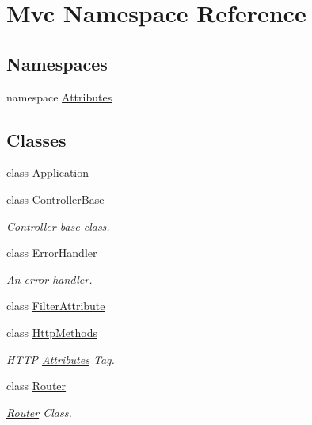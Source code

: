 \hypertarget{namespace_mvc}{}\section{Mvc Namespace Reference}
\label{namespace_mvc}
\subsection*{Namespaces}
\begin{DoxyCompactItemize}
\item 
namespace \hyperlink{namespace_mvc_1_1_attributes}{Attributes}
\end{DoxyCompactItemize}
\subsection*{Classes}
\begin{DoxyCompactItemize}
\item 
class \hyperlink{class_mvc_1_1_application}{Application}
\item 
class \hyperlink{class_mvc_1_1_controller_base}{Controller\+Base}
\begin{DoxyCompactList}\small\item\em Controller base class. \end{DoxyCompactList}\item 
class \hyperlink{class_mvc_1_1_error_handler}{Error\+Handler}
\begin{DoxyCompactList}\small\item\em An error handler. \end{DoxyCompactList}\item 
class \hyperlink{class_mvc_1_1_filter_attribute}{Filter\+Attribute}
\item 
class \hyperlink{class_mvc_1_1_http_methods}{Http\+Methods}
\begin{DoxyCompactList}\small\item\em H\+T\+TP \hyperlink{namespace_mvc_1_1_attributes}{Attributes} Tag. \end{DoxyCompactList}\item 
class \hyperlink{class_mvc_1_1_router}{Router}
\begin{DoxyCompactList}\small\item\em \hyperlink{class_mvc_1_1_router}{Router} Class. \end{DoxyCompactList}\end{DoxyCompactItemize}
